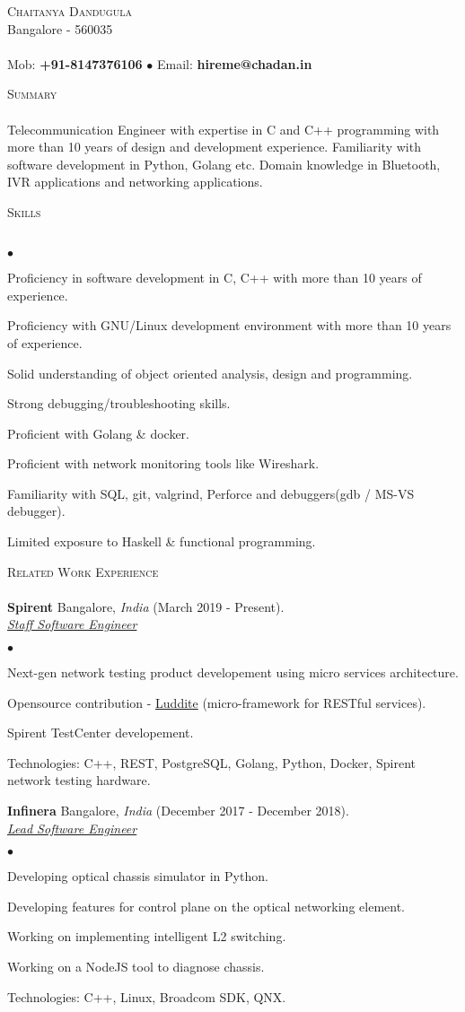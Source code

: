 \documentclass[a4paper]{article}
\newcommand{\lineunder}{\vspace*{-8pt} \\ \hspace*{-18pt} \hrulefill \\}
\newcommand{\header}[1]{{\hspace*{-15pt}\vspace*{6pt} \textsc{#1}} \vspace*{-6pt} \lineunder}
\newcommand{\employer}[4]{{ \textbf{#1} #2  (#3).\\ \underline{\emph{#4}}\\  }}
\newcommand{\contact}[3]{
\vspace*{-8pt}
\begin{center}
{\LARGE \scshape {#1}}\\
#2 \lineunder
#3
\end{center}
\vspace*{-8pt}
}
\newenvironment{achievements}{\begin{list}{$\bullet$}{\topsep 0pt \itemsep -2pt}}{\vspace*{4pt}\end{list}}
\begin{document}
\small
\smallskip
\contact{Chaitanya Dandugula}
{Bangalore - 560035}
{Mob: \textbf{+91-8147376106} $\bullet$ Email: \textbf{hireme@chadan.in}}
\vspace*{5pt}

\header{Summary}
Telecommunication Engineer with expertise in C and C++ programming with more than 10 years of design and development experience. Familiarity with software development in Python, Golang etc.
Domain knowledge in Bluetooth, IVR applications and networking applications.

\header{Skills}
\begin{achievements}
\item Proficiency in software development in C, C++ with more than 10 years of experience.
\item Proficiency with GNU/Linux development environment with more than 10 years of experience.
\item Solid understanding of object oriented analysis, design and programming.
\item Strong debugging/troubleshooting skills.
\item Proficient with Golang \& docker.
\item Proficient with network monitoring tools like Wireshark.
\item Familiarity with SQL, git, valgrind, Perforce and debuggers(gdb / MS-VS debugger).
\item Limited exposure to Haskell \& functional programming.
\end{achievements}

\header{Related Work Experience}
\employer{Spirent} {Bangalore, \textit{India}} {March 2019 - Present} {Staff Software Engineer}
	\begin{achievements}
          \item Next-gen network testing product developement using micro services architecture. 
          \item Opensource contribution - \href{https://github.com/SpirentOrion/luddite.v2}{Luddite} (micro-framework for RESTful services).
          \item Spirent TestCenter developement.
          \item Technologies: C++, REST, PostgreSQL, Golang, Python, Docker, Spirent network testing hardware.
	\end{achievements}
\employer{Infinera} {Bangalore, \textit{India}} {December 2017 - December 2018} {Lead Software Engineer}
	\begin{achievements}
          \item Developing optical chassis simulator in Python. 
          \item Developing features for control plane on the optical networking element.
          \item Working on implementing intelligent L2 switching.
          \item Working on a NodeJS tool to diagnose chassis.
          \item Technologies: C++, Linux, Broadcom SDK, QNX.
	\end{achievements}
\end{document}
